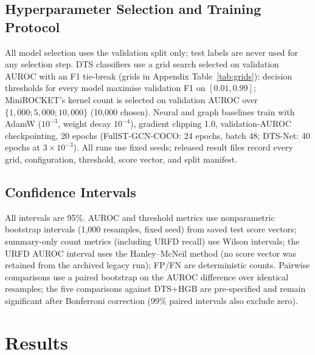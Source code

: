 \subsection{Hyperparameter Selection and Training Protocol}
All model selection uses the validation split only; test labels are never used for any selection step. DTS classifiers use a grid search selected on validation AUROC with an F1 tie-break (grids in Appendix Table~\ref{tab:grids}); decision thresholds for every model maximise validation F1 on $[0.01,0.99]$; MiniROCKET's kernel count is selected on validation AUROC over $\{1{,}000;5{,}000;10{,}000\}$ (10,000 chosen). Neural and graph baselines train with AdamW ($10^{-3}$, weight decay $10^{-4}$), gradient clipping 1.0, validation-AUROC checkpointing, 20 epochs (FullST-GCN-COCO: 24 epochs, batch 48; DTS-Net: 40 epochs at $3{\times}10^{-3}$). All runs use fixed seeds; released result files record every grid, configuration, threshold, score vector, and split manifest.

\subsection{Confidence Intervals}
All intervals are 95\%. AUROC and threshold metrics use nonparametric bootstrap intervals (1,000 resamples, fixed seed) from saved test score vectors; summary-only count metrics (including URFD recall) use Wilson intervals; the URFD AUROC interval uses the Hanley--McNeil method (no score vector was retained from the archived legacy run); FP/FN are deterministic counts. Pairwise comparisons use a paired bootstrap on the AUROC difference over identical resamples; the five comparisons against DTS+HGB are pre-specified and remain significant after Bonferroni correction (99\% paired intervals also exclude zero).

\section{Results}
